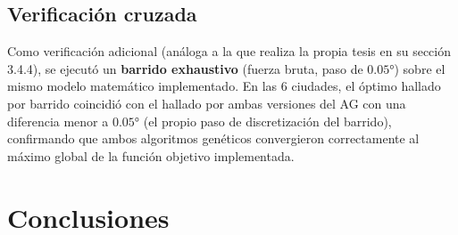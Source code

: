 \documentclass[11pt,a4paper]{article}
\begin{document}
\subsection{Verificación cruzada}

Como verificación adicional (análoga a la que realiza la propia tesis en su
sección 3.4.4), se ejecutó un \textbf{barrido exhaustivo} (fuerza bruta,
paso de $0.05°$) sobre el mismo modelo matemático implementado. En las 6
ciudades, el óptimo hallado por barrido coincidió con el hallado por ambas
versiones del AG con una diferencia menor a $0.05°$ (el propio paso de
discretización del barrido), confirmando que ambos algoritmos genéticos
convergieron correctamente al máximo global de la función objetivo
implementada.

\section{Conclusiones}
\end{document}
